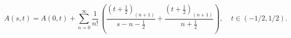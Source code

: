 \begin{equation}
A(s,t)=
A(0,t)+
\sum_{n=0}^\infty
\frac{1}{n!}\,
\left(
\frac{(t+\frac{1}{2})_{(n+1)}}{s-n-\frac{1}{2}} +
\frac{(t+\frac{1}{2})_{(n+1)}}{n+\frac{1}{2}}
\right) ,\ \ \ \ \
t \in (-1/2, 1/2).
\label{5}
\end{equation}

